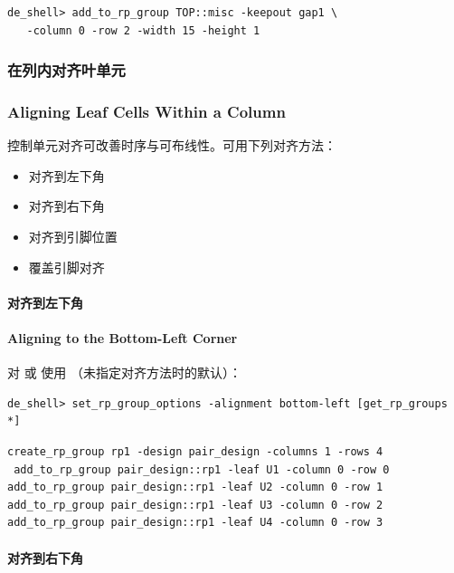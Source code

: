 \begin{lstlisting}
de_shell> add_to_rp_group TOP::misc -keepout gap1 \
   -column 0 -row 2 -width 15 -height 1
\end{lstlisting}

\subsubsection{在列内对齐叶单元}
\subsubsection*{Aligning Leaf Cells Within a Column}

控制单元对齐可改善时序与可布线性。可用下列对齐方法：
\begin{itemize}
  \item 对齐到左下角
  \item 对齐到右下角
  \item 对齐到引脚位置
  \item 覆盖引脚对齐
\end{itemize}

\paragraph{对齐到左下角}
\paragraph*{Aligning to the Bottom-Left Corner}

对  或  使用 （未指定对齐方法时的默认）：
\begin{lstlisting}
de_shell> set_rp_group_options -alignment bottom-left [get_rp_groups *]
\end{lstlisting}

\begin{lstlisting}
create_rp_group rp1 -design pair_design -columns 1 -rows 4
 add_to_rp_group pair_design::rp1 -leaf U1 -column 0 -row 0
add_to_rp_group pair_design::rp1 -leaf U2 -column 0 -row 1
add_to_rp_group pair_design::rp1 -leaf U3 -column 0 -row 2
add_to_rp_group pair_design::rp1 -leaf U4 -column 0 -row 3
\end{lstlisting}


\paragraph{对齐到右下角}
